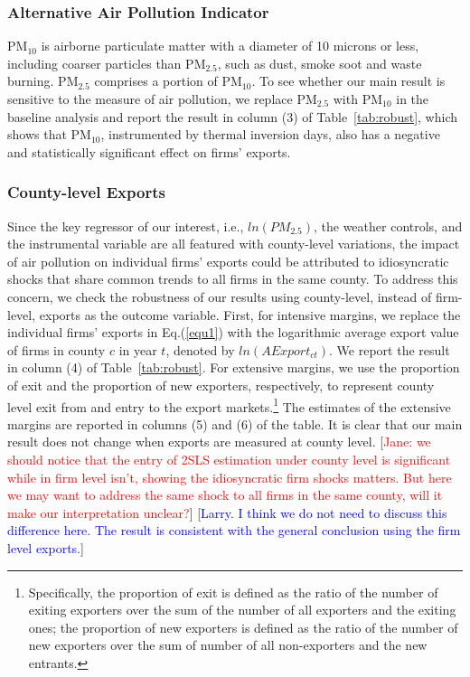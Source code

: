 \documentclass[12pt]{article}
\begin{document}
\subsubsection{Alternative Air Pollution Indicator}
 $\mathrm{PM_{10}}$ is airborne particulate matter with a diameter of 10 microns or less, including coarser particles than $\mathrm{PM_{2.5}}$, such as dust, smoke soot and waste burning. $\mathrm{PM_{2.5}}$ comprises a portion of $\mathrm{PM_{10}}$. To see whether our main result is sensitive
to the measure of air pollution, we replace $\mathrm{PM_{2.5}}$ with $%
\mathrm{PM_{10}}$ in the baseline analysis and report the result in column
(3) of Table~\ref{tab:robust}, which shows that $\mathrm{PM_{10}}$,
instrumented by thermal inversion days, also has a negative and
statistically significant effect on firms' exports.

\subsubsection{County-level Exports}
Since the key regressor of our interest,  i.e., $ln(PM_{2.5})$, the weather
controls, and the instrumental variable are all featured with county-level
variations, the impact of air pollution on individual firms' exports could
be attributed to idiosyncratic shocks that share common trends to all firms
in the same county. To address this concern, we check the robustness of our
results using county-level, instead of firm-level, exports as the outcome
variable. First, for intensive margins, we
replace the individual firms' exports in Eq.(\ref{equ1}) with the
logarithmic average export value of firms in county $c$ in year $t$, denoted
by $ln(AExport_{ct})$. We report the result in column (4) of Table~\ref{tab:robust}. For extensive margins, we use 
the proportion of exit and the proportion of new exporters, respectively, to represent county level exit from and entry to the export markets.\footnote{Specifically, the proportion of exit is defined as 
the ratio of the number of
exiting exporters over the sum of the number of all exporters and the exiting
ones; the proportion of new exporters is defined as 
the ratio of the number of new exporters over the sum of number of all non-exporters and the new entrants.} The estimates of
the extensive margins are reported in columns (5) and (6) of the table. It
is clear that our main result does not change when exports are measured at
county level. [\textcolor{red}{Jane: we should notice that the entry of 2SLS estimation under county level is significant while in firm level isn't, showing the idiosyncratic firm shocks matters. But here we may want to address the same shock to all firms in the same county, will it make our interpretation unclear?}] [\textcolor{blue}{Larry. I think we do not need to discuss this difference here. The result is consistent with the general conclusion using the firm level exports.}] 
\end{document}
